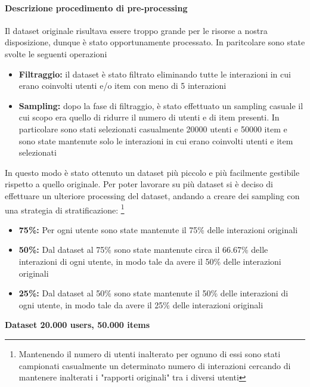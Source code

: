 \paragraph{Descrizione procedimento di pre-processing}


\noindent Il dataset originale risultava essere troppo grande per le risorse a nostra disposizione, dunque è stato opportunamente processato. In paritcolare sono state svolte le seguenti operazioni
\begin{itemize}
    \item \textbf{Filtraggio:} il dataset è stato filtrato eliminando tutte le interazioni in cui erano coinvolti utenti e/o item con meno di 5 interazioni
    \item \textbf{Sampling:} dopo la fase di filtraggio, è stato effettuato un sampling casuale il cui scopo era quello di ridurre il numero di utenti e di item presenti. In particolare sono stati selezionati casualmente 20000 utenti e 50000 item e sono state mantenute solo le interazioni in cui erano coinvolti utenti e item selezionati
\end{itemize}

\noindent In questo modo è stato ottenuto un dataset più piccolo e più facilmente gestibile rispetto a quello originale.
Per poter lavorare su più dataset si è deciso di effettuare un ulteriore processing del dataset, andando a creare dei sampling con una strategia di stratificazione: \footnote{{{Mantenendo il numero di utenti inalterato per ognuno di essi sono stati campionati casualmente un determinato numero di interazioni cercando di mantenere inalterati i "rapporti originali" tra i diversi utenti}}}{}
\begin{itemize}
    \item \textbf{75\%:} Per ogni utente sono state mantenute il 75\% delle interazioni originali
    \item \textbf{50\%:} Dal dataset al 75\% sono state mantenute circa il 66.67\% delle interazioni di ogni utente, in modo tale da avere il 50\% delle interazioni originali
    \item \textbf{25\%:} Dal dataset al 50\% sono state mantenute il 50\% delle interazioni di ogni utente, in modo tale da avere il 25\% delle interazioni originali
\end{itemize}


\noindent\textbf{Dataset 20.000 users, 50.000 items}

